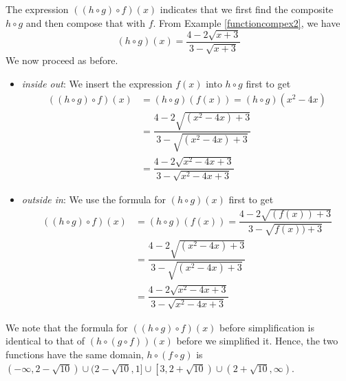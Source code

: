 {\medskip  


The expression $((h \circ g) \circ f)(x)$ indicates that we first find the composite $h \circ g$ and then compose that with $f$.  From Example \ref{functioncompex2}, we have \[(h \circ g)(x) = \frac{4-2\sqrt{x+3}}{3-\sqrt{x+3}}\]  We now proceed as before.

\begin{itemize}

\item  \textit{inside out}: We insert the expression $f(x)$ into $h \circ g$ first to get 
\begin{align*}
((h \circ g) \circ f)(x) & =  (h \circ g)(f(x)) = (h \circ g)\left(x^2-4x\right) \\
                         & =  \dfrac{4-2\sqrt{\left(x^2-4x\right)+3}}{3-\sqrt{\left(x^2-4x\right)+3}} \\[3pt]
                         & =  \dfrac{4 - 2\sqrt{x^2-4x+3}}{3 - \sqrt{x^2-4x+3}}
\end{align*}

\item  \textit{outside in}:  We use the formula for $(h \circ g)(x)$ first to get
\begin{align*}
((h \circ g) \circ f)(x) & = (h \circ g)(f(x))=\dfrac{4-2\sqrt{(f(x))+3}}{3-\sqrt{f(x))+3}}\\[3pt]
 & = \dfrac{4 - 2\sqrt{\left(x^2-4x\right)+3}}{3 - \sqrt{\left(x^2-4x\right)+3}}\\[3pt]
 & = \dfrac{4 - 2\sqrt{x^2-4x+3}}{3 - \sqrt{x^2-4x+3}}
 \end{align*}
 
 \end{itemize}

 
We note that the formula for $((h \circ g) \circ f)(x)$ before simplification is identical to that of $(h \circ (g \circ f))(x)$ before we simplified it.  Hence, the two functions have the same domain, $h \circ (f \circ g)$ is $(-\infty, 2 -\sqrt{10}) \cup (2 - \sqrt{10}, 1] \cup \left[3, 2 + \sqrt{10}\right) \cup \left(2+\sqrt{10}, \infty\right)$. 
}

\medskip



